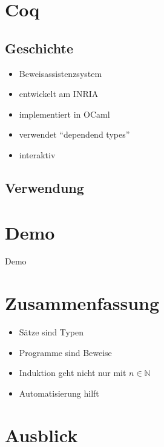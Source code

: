 \documentclass[aspectratio=169]{beamer}
\begin{document}
\section{Coq}
\subsection{Geschichte}
\begin{frame}
  \begin{itemize}
  \item Beweisassistenzsystem
  \item entwickelt am INRIA
  \item implementiert in OCaml
  \item verwendet ``dependend types''
  \item interaktiv
  \end{itemize}
\end{frame}
\subsection{Verwendung}
\section{Demo}
\begin{frame}
  \begin{center}
    \huge{Demo}
  \end{center}
\end{frame}
\section{Zusammenfassung}
\begin{frame}
    \begin{itemize}
  \item Sätze sind Typen
  \item Programme sind Beweise
  \item Induktion geht nicht nur mit $n\in\mathbb{N}$
  \item Automatisierung hilft
  \end{itemize}
\end{frame}
\section{Ausblick}
\begin{frame}
\end{frame} %
\end{document}
